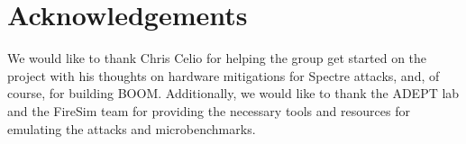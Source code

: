 \section{Acknowledgements}

We would like to thank Chris Celio for helping the group 
get started on the project with his thoughts on hardware mitigations for
Spectre attacks, and, of course, for building BOOM.
Additionally, we would like to thank the ADEPT lab and the FireSim
team for providing the necessary tools and resources for emulating the attacks and 
microbenchmarks.
